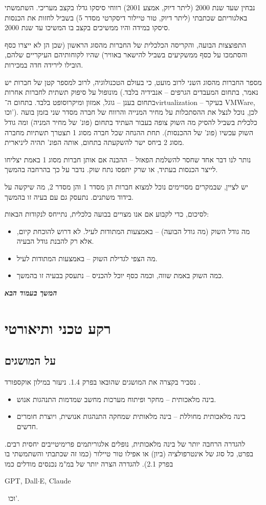\documentclass[]{article}
\newcommand\en[1] {\begin{otherlanguage}{english}#1\end{otherlanguage}}
\newcommand\npage {\vfil {\hfil \textbf{\textit{המשך בעמוד הבא}}} \hfil \vfil \pagebreak}
\theoremstyle{definition}
\begin{document}
\begin{multicols}{2}
		נבחין שעד שנת 2000 (ליתר דיוק, אמצע 2001) רווחי סיסקו גדלו בקצב מעריכי. השתמשתי באלגוריתם שכתבתי (ליתר דיוק, טור טיילור דיסקרטי מסדר 5) בשביל לחזות את הכנסות סיסקו במידה והיו ממשיכים בקצב בו המשיכו עד שנת 2000.
		
		התפוצצות הבועה, והקריסה הכלכלית של החברות מהסוג הראשון (שכן הן לא ייצרו כסף והסתמכו על כסף ממשקיעים בשביל להישאר באוויר) שהיו לקוחותיהם העיקריים שלהם, הובילו לירידה חדה במכירות. 
		
		
		מספר החברות מהסוג השני לרוב מועט, כי בעולם הטכנולוגיה, לרוב למספר קטן של חברות יש מונופול על סיפוק תשתית לחברות אחרות (נאמר, בתחום המעבדים הגרפים – אנבידיה בלבד. בתחום בענן – גוגל, אמזון ומיקרוסופט בלבד. בתחום ה־virtualization – בעיקר VMWare, וכו'). לכן, נוכל לנצל את ההסתכלות על מחיר המנייה והרווח של חברה מסדר שני בזמן בועה כלכלית בשביל להסיק מה השוק צופה בעבור העתיד בתחום (פונ' של מחיר המניה) ומה גודל השוק עכשיו (פונ' של ההכנסות). תחת ההנחה שכל חברה מסוג 1 תצטרך תשתיות מחברה מסוג 2 ביחס ישר להשקעתה בתחום, אותה הפונ' תהיה ליניארית. 
		
		נותר לנו דבר אחד שחסר להשלמת הפאזל – ההבנה אם אותן חברות מסוג 1 באמת יצליחו לייצר הכנסות בעתיד, או שרק יתפסו נתח שוק. נדבר על כך בהרחבה בהמשך. 
		
		יש לציין, שבמקרים מסויימים נוכל למצוא חברות הן מסדר 1 והן מסדר 2, מה שיקשה על בידוד משתנים. נתעסק גם עם בעיה זו בהמשך. 
		
		לסיכום, כדי לקבוע אם אנו מצויים בבועה כלכלית, נתייחס לנקודות הבאות: 
		\begin{itemize}
			\item מה גודל השוק (מה גודל הבועה) – באמצעות המתודות לעיל. לא דרוש להוכחת קיום, אלא רק להבנת גודל הבעיה. 
			\item מה הצפי לגדילת השוק – באמצעות המתודות לעיל. 
			\item כמה השוק באמת שווה, וכמה כסף יוכל להכניס – נתעסק בבעיה זו בהמשך. 
		\end{itemize}
	\end{multicols}
	
	\npage
	
	\section{רקע טכני ותיאורטי}
	
	\subsection{על המושגים}
	נסביר בקצרה את המושגים שהובאו בפרק 1.4. ניעזר במילון אוקספורד \cite{OxfordDict}. 
	\begin{itemize}
		\item בינה מלאכותית – מחקר ופיתוח מערכות מחשב שמדמות התנהגות אנוש. 
		\item בינה מלאכותית מחוללת – בינה מלאותית שמחקה התנהגות אנושית, ויוצרת חומרים חדשים. 
	\end{itemize}
	להגדרה הרחבה יותר של בינה מלאכותית, נופלים אלגוריתמים פרימיטייבים יחסית רבים. בפרט, כל סוג של אינטרפולציה (ביון) או אפילו טור טיילור (כמו זה שכתבתי והשתמשתי בו בפרק 2.1). להגדרה הצרה יותר של במ"מ נכנסים מודלים כמו \en{GPT, Dall$\cdot$E, Claude}\,  וכו'. 
	
\end{document}
